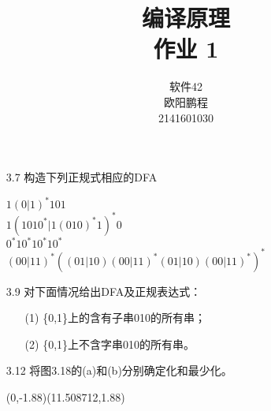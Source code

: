 \documentclass[]{ctexart}
\title{编译原理 \\ 作业 1}
\author{软件42 \\ 欧阳鹏程 \\ 2141601030}
\begin{document}
\maketitle

\begin{enumerate}
	\item[3.7] 构造下列正规式相应的DFA
	\begin{center}
		$1(0|1)^{*}101$ \\
		$1(1010^{*}|1(010)^{*}1)^{*}0$ \\
		$0^{*}10^{*}10^{*}10^{*}$ \\
		$(00|11)^{*}((01|10)(00|11)^{*}(01|10)(00|11)^{*})^{*}$
	\end{center}

	\item[3.9] 对下面情况给出DFA及正规表达式：
	\begin{enumerate}
		\item[(1)] \{0,1\}上的含有子串010的所有串；
		\item[(2)] \{0,1\}上不含字串010的所有串。
	\end{enumerate}

	\item[3.12] 将图3.18的(a)和(b)分别确定化和最少化。
	\begin{center}
	{
		\begin{pspicture}(0,-1.88)(11.508712,1.88)
		

\end{pspicture}}
\end{center}
\end{enumerate}
\end{document}
